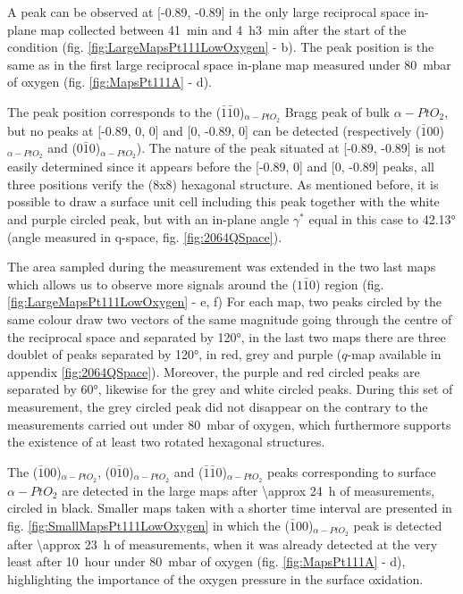 A peak can be observed at [-0.89, -0.89] in the only large reciprocal space in-plane map collected between \qty{41}{\minute} and \qty{4}{\hour}\qty{3}{\minute} after the start of the condition (fig. \ref{fig:LargeMapsPt111LowOxygen} - b).
The peak position is the same as in the first large reciprocal space in-plane map measured under \qty{80}{\milli\bar} of oxygen (fig. \ref{fig:MapsPt111A} - d).

The peak position corresponds to the ($\bar{1}\bar{1}0$)$_{\alpha-PtO_2}$ Bragg peak of bulk $\alpha-PtO_2$, but no peaks at [-0.89, 0, 0] and [0, -0.89, 0] can be detected (respectively ($\bar{1}00$)$_{\alpha-PtO_2}$ and ($0\bar{1}0$)$_{\alpha-PtO_2}$).
The nature of the peak situated at [-0.89, -0.89] is not easily determined since it appears before the [-0.89, 0] and [0, -0.89] peaks, all three positions verify the (8x8) hexagonal structure.
As mentioned before, it is possible to draw a surface unit cell including this peak together with the white and purple circled peak, but with an in-plane angle $\gamma^*$ equal in this case to \ang{42.13} (angle measured in q-space, fig. \ref{fig:2064QSpace}).

The area sampled during the measurement was extended in the two last maps which allows us to observe more signals around the ($1\bar{1}0$) region (fig. \ref{fig:LargeMapsPt111LowOxygen} - e, f)
For each map, two peaks circled by the same colour draw two vectors of the same magnitude going through the centre of the reciprocal space and separated by \ang{120}, in the last two maps there are three doublet of peaks separated by \ang{120}, in red, grey and purple ($q$-map available in appendix \ref{fig:2064QSpace}).
Moreover, the purple and red circled peaks are separated by \ang{60}, likewise for the grey and white circled peaks.
During this set of measurement, the grey circled peak did not disappear on the contrary to the measurements carried out under \qty{80}{\milli\bar} of oxygen, which furthermore supports the existence of at least two rotated hexagonal structures.

The ($\bar{1}0$0)$_{\alpha-PtO_2}$, ($0\bar{1}$0)$_{\alpha-PtO_2}$ and ($\bar{1}\bar{1}$0)$_{\alpha-PtO_2}$ peaks corresponding to surface ${\alpha-PtO_2}$ are detected in the large maps after \qty{\approx 24}{\hour} of measurements, circled in black.
Smaller maps taken with a shorter time interval are presented in fig. \ref{fig:SmallMapsPt111LowOxygen} in which the ($\bar{1}0$0)$_{\alpha-PtO_2}$ peak is detected after \qty{\approx 23}{\hour} of measurements, when it was already detected at the very least after \qty{10}{hour} under \qty{80}{\milli\bar} of oxygen (fig. \ref{fig:MapsPt111A} - d), highlighting the importance of the oxygen pressure in the surface oxidation.

